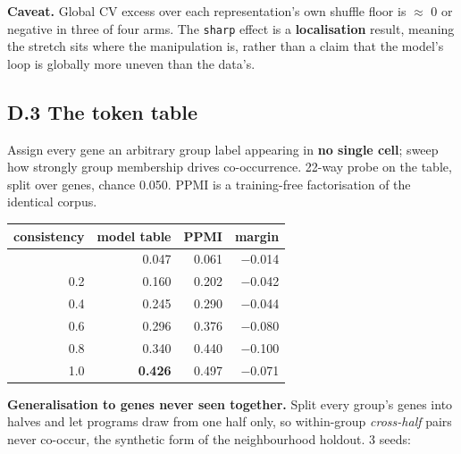 \textbf{Caveat.} Global CV excess over each representation's own shuffle floor is \(\approx\) 0 or negative in three
of four arms. The \texttt{sharp} effect is a \textbf{localisation} result, meaning the stretch sits where the manipulation
is, rather than a claim that the model's loop is globally more uneven than the data's.

\hypertarget{d.3-the-token-table}{%
\subsection{D.3 The token table}\label{d.3-the-token-table}}

Assign every gene an arbitrary group label appearing in \textbf{no single cell}; sweep how strongly group
membership drives co-occurrence. 22-way probe on the table, split over genes, chance 0.050. PPMI is a
training-free factorisation of the identical corpus.

\begin{longtable}[]{@{}rrrr@{}}
\toprule\noalign{}
consistency & model table & PPMI & margin \\
\midrule\noalign{}
\endhead
\bottomrule\noalign{}
\endlastfoot
0.0 & 0.047 & 0.061 & \(-\)0.014 \\
0.2 & 0.160 & 0.202 & \(-\)0.042 \\
0.4 & 0.245 & 0.290 & \(-\)0.044 \\
0.6 & 0.296 & 0.376 & \(-\)0.080 \\
0.8 & 0.340 & 0.440 & \(-\)0.100 \\
1.0 & \textbf{0.426} & 0.497 & \(-\)0.071 \\
\end{longtable}

\textbf{Generalisation to genes never seen together.} Split every group's genes into halves and let programs
draw from one half only, so within-group \emph{cross-half} pairs never co-occur, the synthetic form of the
neighbourhood holdout. 3 seeds:


